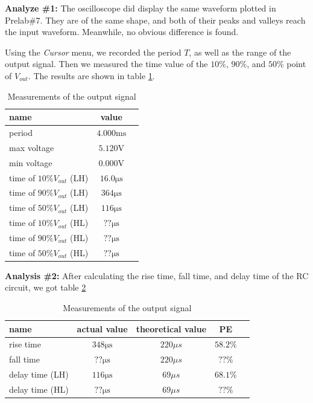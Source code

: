 \textbf{Analyze \#1:} \newline
\phantom{ } The oscilloscope did display the same waveform plotted in Prelab\#7. They are of the same shape, and both of their peaks and valleys reach the input waveform. Meanwhile, no obvious difference is found. \newline

Using the \textit{Cursor} menu, we recorded the period $T$, as well as the range of the output signal. Then we measured the time value of the $10\%$, $90\%$, and $50\%$ point of $V_{out}$. The results are shown in table \ref{tab:mea}.

\begin{table}[!htbp]
	\centering
	\caption{Measurements of the output signal}
	\begin{tabular}{lcl}
		\toprule
		name & value & \\
		\midrule
		period & $4.000\mathrm{ms}$ & \\
		max voltage & $5.120\mathrm{V}$ & \\
		min voltage & $0.000\mathrm{V}$ & \\
		time of $10\% V_{out}$ (LH) & $16.0\mathrm{\mu s}$ & \\
		time of $90\% V_{out}$ (LH) & $364\mathrm{\mu s}$ & \\
		time of $50\% V_{out}$ (LH) & $116\mathrm{\mu s}$ & \\
		time of $10\% V_{out}$ (HL) & $??\mathrm{\mu s}$ & \\
		time of $90\% V_{out}$ (HL) & $??\mathrm{\mu s}$ & \\
		time of $50\% V_{out}$ (HL) & $??\mathrm{\mu s}$ & \\
		\bottomrule
	\end{tabular}
	\label{tab:mea}
\end{table}

\textbf{Analysis \#2:} \newline
\phantom{ } After calculating the rise time, fall time, and delay time of the RC circuit, we got table \ref{tab:cal}

\begin{table}[!htbp]
	\centering
	\caption{Measurements of the output signal}
	\begin{tabular}{lcccl}
		\toprule
		name & actual value & theoretical value & PE & \\
		\midrule
		rise time & $348\mathrm{\mu s}$ & ${220\mu s}$ & $58.2\%$ & \\
		fall time & $??\mathrm{\mu s}$ &  ${220\mu s}$ & $??\%$ & \\
		delay time (LH) & $116\mathrm{\mu s}$ & ${69\mu s}$ & $68.1\%$ & \\
		delay time (HL) & $??\mathrm{\mu s}$ &  ${69\mu s}$ & $??\%$ & \\
		\bottomrule
	\end{tabular}
	\label{tab:cal}
\end{table}


